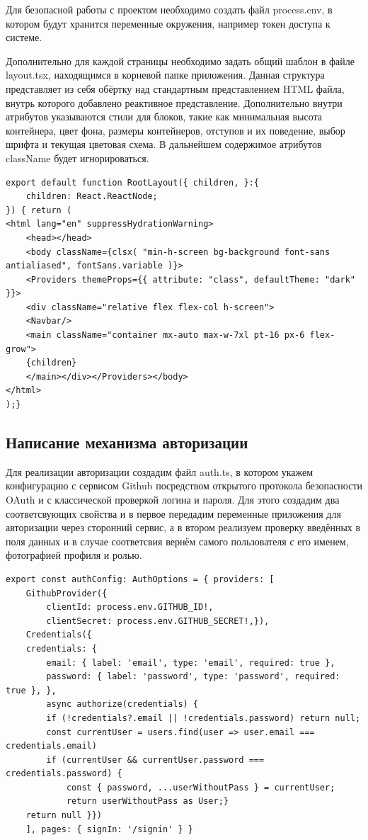 \documentclass[master, och, pract]{SCWorks}
\begin{document}
Для безопасной работы с проектом необходимо создать файл process.env, в котором будут хранится переменные окружения, например токен доступа к системе.

Дополнительно для каждой страницы необходимо задать общий шаблон в файле layout.tsx, находящимся в корневой папке приложения. Данная структура представляет из себя обёртку над стандартным представлением HTML файла, внутрь которого добавлено реактивное представление. Дополнительно внутри атрибутов указываются стили для блоков, такие как минимальная высота контейнера, цвет фона, размеры контейнеров, отступов и их поведение, выбор шрифта и текущая цветовая схема. В дальнейшем содержимое атрибутов className будет  игнорироваться. 
\begin{verbatim}
export default function RootLayout({ children, }:{
	children: React.ReactNode;
}) { return (
<html lang="en" suppressHydrationWarning>  
    <head></head>
    <body className={clsx( "min-h-screen bg-background font-sans antialiased", fontSans.variable )}>
    <Providers themeProps={{ attribute: "class", defaultTheme: "dark" }}>
    <div className="relative flex flex-col h-screen">
    <Navbar/>
    <main className="container mx-auto max-w-7xl pt-16 px-6 flex-grow">
    {children}
    </main></div></Providers></body>
</html>
);}
\end{verbatim}




\subsection{Написание механизма авторизации}
Для реализации авторизации создадим файл auth.ts, в котором укажем конфигурацию с сервисом Github посредством открытого протокола безопасности OAuth и с классической проверкой логина и пароля. Для этого создадим два соответсвующих свойства и в первое передадим переменные приложения для авторизации через сторонний сервис, а в втором реализуем проверку введённых в поля данных и в случае соответсвия вернём самого пользователя с его именем, фотографией профиля и ролью\cite{Fain_2022}.
\begin{verbatim}
export const authConfig: AuthOptions = { providers: [
    GithubProvider({
        clientId: process.env.GITHUB_ID!,
        clientSecret: process.env.GITHUB_SECRET!,}),
    Credentials({
    credentials: {
        email: { label: 'email', type: 'email', required: true },
        password: { label: 'password', type: 'password', required: true }, },
        async authorize(credentials) {
        if (!credentials?.email || !credentials.password) return null;
        const currentUser = users.find(user => user.email === credentials.email)
        if (currentUser && currentUser.password === credentials.password) {
            const { password, ...userWithoutPass } = currentUser;
            return userWithoutPass as User;}
    return null }})
    ], pages: { signIn: '/signin' } }
\end{verbatim}
\end{document}
